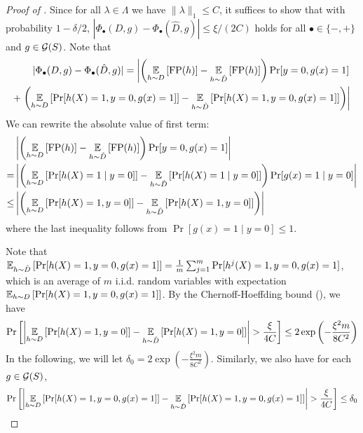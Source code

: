 \begin{proof}[Proof of ]
    Since for all $\lambda\in \Lambda$ we have $\|\lambda\|_1 \leq C$,
    it suffices to show that with probability $1 - \delta/2$,
    $|\Phi_\bullet(D, g) - \Phi_\bullet(\hat D, g)| \leq \xi/(2C)$
    holds for all $\bullet\in \{-, +\}$ and $g\in \mathcal{G}(S)$. Note that
  \begin{align*}
    |\Phi_\bullet(D, g) - \Phi_\bullet(\hat D, g)| = \left|\left(\operatorname*{\mathbb{E}}_{h\sim
    D}\left[ \mathrm{FP}(h)\right] - \operatorname*{\mathbb{E}}_{h\sim \hat D}\left[\mathrm{FP}(h)\right] \right)\Pr[y=0 , g(x) =
    1] \right. \\+ \left. \left(\operatorname*{\mathbb{E}}_{h\sim D}\left[\Pr[h(X) = 1, y= 0, g(x) = 1 ]\right] -
    \operatorname*{\mathbb{E}}_{h\sim \hat D}\left[\Pr[h(X) = 1, y= 0, g(x) = 1 ]\right] \right)\right|
  \end{align*}
  We can rewrite the absolute value of first term:
  \begin{align*}
    &    \left|\left(\operatorname*{\mathbb{E}}_{h\sim D}\left[ \mathrm{FP}(h)\right] - \operatorname*{\mathbb{E}}_{h\sim \hat D}\left[\mathrm{FP}(h)\right]
      \right)\Pr[y=0 , g(x) = 1] \right|\\ = &\left|\left(\operatorname*{\mathbb{E}}_{h\sim D}\left[ \Pr[h(X) = 1\mid y=0]\right] -
                                               \operatorname*{\mathbb{E}}_{h\sim \hat D}\left[\Pr[h(X) = 1\mid y = 0]\right] \right)\Pr[g(x) =  1\mid y=0]\right|\\
    \leq  &\left|\left(\operatorname*{\mathbb{E}}_{h\sim D}\left[ \Pr[h(X) = 1,  y=0]\right] -
            \operatorname*{\mathbb{E}}_{h\sim \hat D}\left[\Pr[h(X) = 1, y = 0]\right] \right)\right|
  \end{align*}
  where the last inequality follows from
  $\Pr[g(x) = 1\mid y=0] \leq 1$.

  Note that
  $\operatorname*{\mathbb{E}}_{h\sim \hat D}\left[\Pr[h(X) = 1, y= 0, g(x) = 1 ]\right] = \frac{1}{m}
  \sum_{j=1}^m \Pr[h^j(X) = 1, y= 0, g(x) = 1 ]$, which is an average
  of $m$ i.i.d. random variables with expectation
  $\operatorname*{\mathbb{E}}_{h\sim D}\left[\Pr[h(X) = 1, y= 0, g(x) = 1 ]\right]$. By the
  Chernoff-Hoeffding bound (), we have
  \begin{equation}
    \Pr\left[ \left|\operatorname*{\mathbb{E}}_{h\sim D}\left[ \Pr[h(X) = 1, y=0]\right] -
        \operatorname*{\mathbb{E}}_{h\sim \hat D}\left[\Pr[h(X) = 1, y = 0]\right] \right| >
      \frac{\xi}{4C} \right] \leq 2\exp\left(-\frac{ \xi^2 m}{ 8 C^2}
    \right)\label{hp1}\end{equation}
  In the following, we will let $\delta_0 = 2\exp\left(-\frac{ \xi^2 m}{ 8 C^2}
  \right)$.  Similarly, we also have for each $g\in \mathcal{G}(S)$,
  \begin{equation}
    \Pr\left[\left| \operatorname*{\mathbb{E}}_{h\sim D}\left[\Pr[h(X) = 1, y= 0, g(x) = 1 ]\right] -
        \operatorname*{\mathbb{E}}_{h\sim \hat D}\left[\Pr[h(X) = 1, y= 0, g(x) = 1 ]\right]\right| >
      \frac{\xi}{4C}\right] \leq \delta_0\label{hp2}
  \end{equation}



\end{proof}
